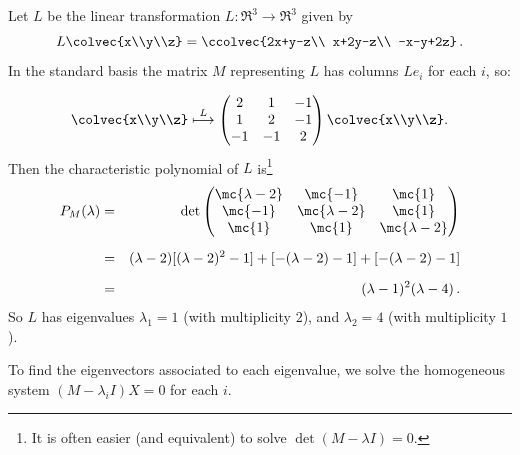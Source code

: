 \begin{example}
Let $L$ be the linear transformation $L \colon \Re^3\rightarrow \Re^3$ given by 
$$L\colvec{x\\y\\z}=\ccolvec{2x+y-z\\ x+2y-z\\ -x-y+2z}\, .$$ 
In the standard basis the matrix $M$ representing $L$ has columns $Le_i$ for each $i$, so:

\[
\colvec{x\\y\\z} \stackrel{L}{\longmapsto} 
\begin{pmatrix}
2 & 1 & -1\\
1 & 2 & -1\\
-1 & -1 & 2\\
\end{pmatrix}\colvec{x\\y\\z}.
\]
Then the characteristic polynomial of $L$ is\footnote{It is often easier (and equivalent) to solve $\det (M-\lambda I)=0$.}
\begin{eqnarray*}
P_M(\lambda)&=&\det \begin{pmatrix}
\mc{\lambda - 2} &\mc{ -1} & \mc{1}\\
\mc{-1} &\mc{ \lambda - 2} & \mc{1}\\
\mc{1} & \mc{1} & \mc{\lambda - 2}\\
\end{pmatrix}\\[2mm]
&=& (\lambda - 2)[ (\lambda - 2)^2-1 ] + 
[-(\lambda - 2)-1 ] +
[-(\lambda - 2)-1] \\[2mm]
&=& (\lambda - 1)^2(\lambda - 4)\, .
\end{eqnarray*}
So $L$ has eigenvalues $\lambda_1=1$ (with multiplicity $2$), and $\lambda_2=4$ (with multiplicity $1$).

To find the eigenvectors associated to each eigenvalue, we solve the homogeneous system $(M-\lambda_iI)X=0$ for each $i$.


\end{example}
